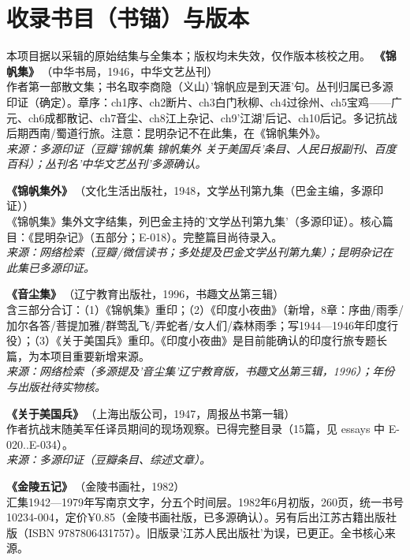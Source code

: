 \documentclass[UTF8,fontset=none,zihao=-4,a4paper]{ctexart}
\begin{document}
\section{收录书目（书锚）与版本}
\noindent\small 本项目据以采辑的原始结集与全集本；版权均未失效，仅作版本核校之用。\normalsize\medskip
\noindent\textbf{《锦帆集》}\,{\small（中华书局，1946，中华文艺丛刊）}\\
作者第一部散文集；书名取李商隐（义山）'锦帆应是到天涯'句。丛刊归属已多源印证（确定）。章序：ch1序、ch2断片、ch3白门秋柳、ch4过徐州、ch5宝鸡——广元、ch6成都散记、ch7音尘、ch8江上杂记、ch9'江湖'后记、ch10后记。多记抗战后期西南/蜀道行旅。注意：昆明杂记不在此集，在《锦帆集外》。
\\{\small\itshape 来源：多源印证（豆瓣'锦帆集 锦帆集外 关于美国兵'条目、人民日报副刊、百度百科）；丛刊名'中华文艺丛刊'多源确认。}
\par\vspace{5pt}
\noindent\textbf{《锦帆集外》}\,{\small（文化生活出版社，1948，文学丛刊第九集（巴金主编，多源印证））}\\
《锦帆集》集外文字结集，列巴金主持的'文学丛刊第九集'（多源印证）。核心篇目：《昆明杂记》（五部分；E-018）。完整篇目尚待录入。
\\{\small\itshape 来源：网络检索（豆瓣/微信读书；多处提及巴金文学丛刊第九集）；昆明杂记在此集已多源印证。}
\par\vspace{5pt}
\noindent\textbf{《音尘集》}\,{\small（辽宁教育出版社，1996，书趣文丛第三辑）}\\
含三部分合订：（1）《锦帆集》重印；（2）《印度小夜曲》（新增，8章：序曲/雨季/加尔各答/菩提加雅/群莺乱飞/弄蛇者/女人们/森林雨季；写1944—1946年印度行役）；（3）《关于美国兵》重印。《印度小夜曲》是目前能确认的印度行旅专题长篇，为本项目重要新增来源。
\\{\small\itshape 来源：网络检索（多源提及'音尘集'辽宁教育版，书趣文丛第三辑，1996）；年份与出版社待实物核。}
\par\vspace{5pt}
\noindent\textbf{《关于美国兵》}\,{\small（上海出版公司，1947，周报丛书第一辑）}\\
作者抗战末随美军任译员期间的现场观察。已得完整目录（15篇，见 essays 中 E-020..E-034）。
\\{\small\itshape 来源：多源印证（豆瓣条目、综述文章）。}
\par\vspace{5pt}
\noindent\textbf{《金陵五记》}\,{\small（金陵书画社，1982）}\\
汇集1942—1979年写南京文字，分五个时间层。1982年6月初版，260页，统一书号10234-004，定价¥0.85（金陵书画社版，已多源确认）。另有后出江苏古籍出版社版（ISBN 9787806431757）。旧版录'江苏人民出版社'为误，已更正。全书核心来源。
\end{document}

